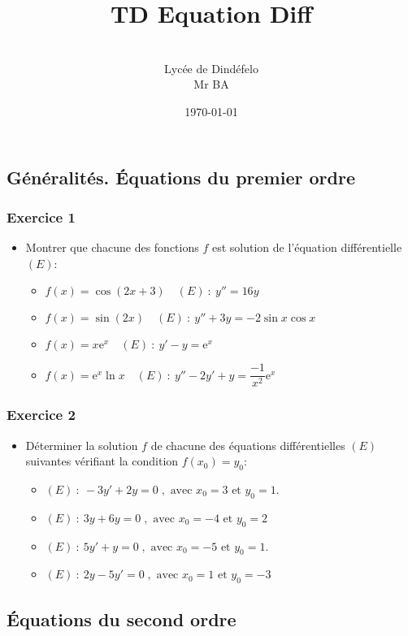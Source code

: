 \documentclass[12pt]{article}
\author{\\Lycée de Dindéfelo\\Mr BA}
\title{\textbf{TD Equation Diff}}
\date{\today}
\begin{document}
\maketitle
\newpage
\subsection*{Généralités. Équations du premier ordre}
\subsubsection*{Exercice 1}
\begin{itemize}
    \item Montrer que chacune des fonctions \(f\) est solution de l'équation différentielle \((E)\):
    \begin{itemize}
        \item \(f(x)=\cos(2x+3)\quad(E)\ :\  y''=16y\)
        \item \(f(x)=\sin(2x)\quad(E)\ :\  y''+3y=-2\sin x\cos x\)
        \item \(f(x)=x\mathrm{e}^{x}\quad(E)\ :\  y'-y=\mathrm{e}^{x}\)
        \item \(f(x)=\mathrm{e}^{x}\ln x\quad(E)\ :\  y''-2y'+y=\dfrac{-1}{x^{2}}\mathrm{e}^{x}\)
    \end{itemize}
\end{itemize}
\subsubsection*{Exercice 2}
\begin{itemize}
    \item Déterminer la solution \(f\) de chacune des équations différentielles \((E)\) suivantes vérifiant la condition \(f(x_{0})=y_{0}\):
    \begin{itemize}
        \item \((E)\ :\ -3y'+2y=0\;,\text{ avec }x_{0}=3\text{ et }y_{0}=1.\)
        \item \((E)\ :\ 3y+6y=0\;,\text{ avec }x_{0}=-4\text{ et }y_{0}=2\)
        \item \((E)\ :\ 5y'+y=0\;,\text{ avec }x_{0}=-5\text{ et }y_{0}=1.\)
        \item \((E)\ :\ 2y-5y'=0\;,\text{ avec }x_{0}=1\text{ et }y_{0}=-3\)
    \end{itemize}
\end{itemize}

\subsection*{Équations du second ordre}
\end{document}
